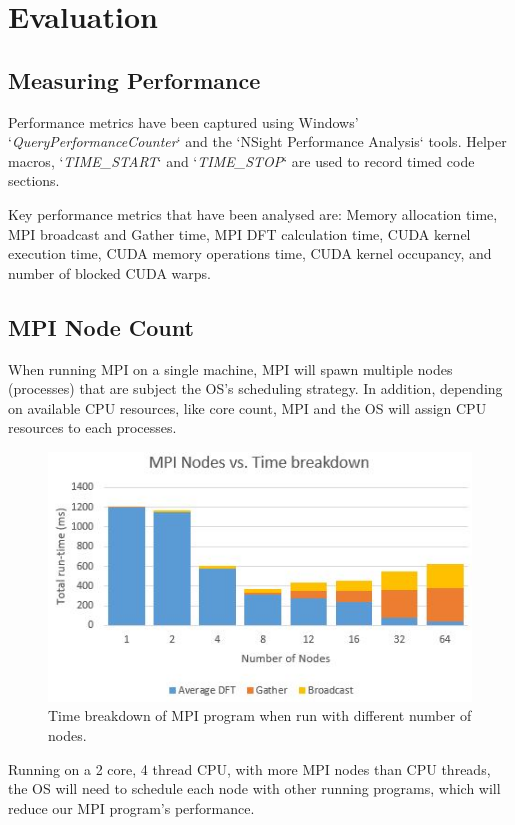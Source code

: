 \documentclass[11pt,a4paper]{article}
\begin{document}
\section{Evaluation}
\subsection{Measuring Performance}
Performance metrics have been captured using Windows' `\textit{QueryPerformanceCounter}` and the `NSight Performance Analysis` tools. Helper macros, `\textit{TIME\_START}` and `\textit{TIME\_STOP}` are used to record timed code sections.

Key performance metrics that have been analysed are: Memory allocation time, MPI broadcast and Gather time, MPI DFT calculation time, CUDA kernel execution time, CUDA memory operations time, CUDA kernel occupancy, and number of blocked CUDA warps.

\subsection{MPI Node Count}\label{sect:MPI Node Count}
When running MPI on a single machine, MPI will spawn multiple nodes (processes) that are subject the OS's scheduling strategy. In addition, depending on available CPU resources, like core count, MPI and the OS will assign CPU resources to each processes.

\begin{figure}
\begin{center}
\includegraphics[scale=0.7]{mpi_eval_nodes}
\end{center}
\caption{Time breakdown of MPI program when run with different number of nodes.}
\label{fig:mpi_eval_nodes}
\end{figure}

Running on a 2 core, 4 thread CPU, with more MPI nodes than CPU threads, the OS will need to schedule each node with other running programs, which will reduce our MPI program's performance.
\end{document}
